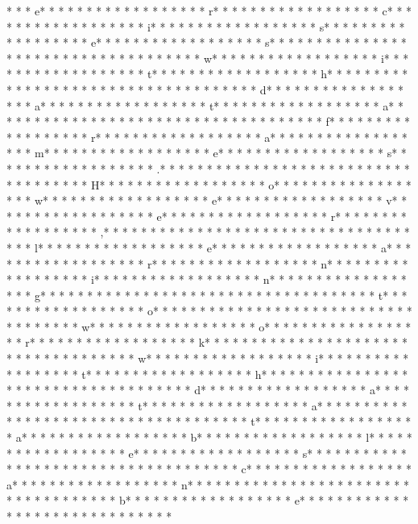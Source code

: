 * *  * e* * *  * * *  * * *  *  * * *  *  * * *  * r* * *  * * *  * * *  *  * * *  *  * * *  * c* * *  * * *  * * *  *  * * *  *  * * *  * i* * *  * * *  * * *  *  * * *  *  * * *  * s* * *  * * *  * * *  *  * * *  *  * * *  * e* * *  * * *  * * *  *  * * *  *  * * *  * s* * *  * * *  * * *  *  * * *  *  * * *  *  * * *  * * *  * * *  *  * * *  *  * * *  * w* * *  * * *  * * *  *  * * *  *  * * *  * i* * *  * * *  * * *  *  * * *  *  * * *  * t* * *  * * *  * * *  *  * * *  *  * * *  * h* * *  * * *  * * *  *  * * *  *  * * *  *  * * *  * * *  * * *  *  * * *  *  * * *  * d* * *  * * *  * * *  *  * * *  *  * * *  * a* * *  * * *  * * *  *  * * *  *  * * *  * t* * *  * * *  * * *  *  * * *  *  * * *  * a* * *  * * *  * * *  *  * * *  *  * * *  *  * * *  * * *  * * *  *  * * *  *  * * *  * f* * *  * * *  * * *  *  * * *  *  * * *  * r* * *  * * *  * * *  *  * * *  *  * * *  * a* * *  * * *  * * *  *  * * *  *  * * *  * m* * *  * * *  * * *  *  * * *  *  * * *  * e* * *  * * *  * * *  *  * * *  *  * * *  * s* * *  * * *  * * *  *  * * *  *  * * *  * .* * *  * * *  * * *  *  * * *  *  * * *  *  * * *  * * *  * * *  *  * * *  *  * * *  * H* * *  * * *  * * *  *  * * *  *  * * *  * o* * *  * * *  * * *  *  * * *  *  * * *  * w* * *  * * *  * * *  *  * * *  *  * * *  * e* * *  * * *  * * *  *  * * *  *  * * *  * v* * *  * * *  * * *  *  * * *  *  * * *  * e* * *  * * *  * * *  *  * * *  *  * * *  * r* * *  * * *  * * *  *  * * *  *  * * *  * ,* * *  * * *  * * *  *  * * *  *  * * *  *  * * *  * * *  * * *  *  * * *  *  * * *  * l* * *  * * *  * * *  *  * * *  *  * * *  * e* * *  * * *  * * *  *  * * *  *  * * *  * a* * *  * * *  * * *  *  * * *  *  * * *  * r* * *  * * *  * * *  *  * * *  *  * * *  * n* * *  * * *  * * *  *  * * *  *  * * *  * i* * *  * * *  * * *  *  * * *  *  * * *  * n* * *  * * *  * * *  *  * * *  *  * * *  * g* * *  * * *  * * *  *  * * *  *  * * *  *  * * *  * * *  * * *  *  * * *  *  * * *  * t* * *  * * *  * * *  *  * * *  *  * * *  * o* * *  * * *  * * *  *  * * *  *  * * *  *  * * *  * * *  * * *  *  * * *  *  * * *  * w* * *  * * *  * * *  *  * * *  *  * * *  * o* * *  * * *  * * *  *  * * *  *  * * *  * r* * *  * * *  * * *  *  * * *  *  * * *  * k* * *  * * *  * * *  *  * * *  *  * * *  *  * * *  * * *  * * *  *  * * *  *  * * *  * w* * *  * * *  * * *  *  * * *  *  * * *  * i* * *  * * *  * * *  *  * * *  *  * * *  * t* * *  * * *  * * *  *  * * *  *  * * *  * h* * *  * * *  * * *  *  * * *  *  * * *  *  * * *  * * *  * * *  *  * * *  *  * * *  * d* * *  * * *  * * *  *  * * *  *  * * *  * a* * *  * * *  * * *  *  * * *  *  * * *  * t* * *  * * *  * * *  *  * * *  *  * * *  * a* * *  * * *  * * *  *  * * *  *  * * *  *  * * *  * * *  * * *  *  * * *  *  * * *  * t* * *  * * *  * * *  *  * * *  *  * * *  * a* * *  * * *  * * *  *  * * *  *  * * *  * b* * *  * * *  * * *  *  * * *  *  * * *  * l* * *  * * *  * * *  *  * * *  *  * * *  * e* * *  * * *  * * *  *  * * *  *  * * *  * s* * *  * * *  * * *  *  * * *  *  * * *  *  * * *  * * *  * * *  *  * * *  *  * * *  * c* * *  * * *  * * *  *  * * *  *  * * *  * a* * *  * * *  * * *  *  * * *  *  * * *  * n* * *  * * *  * * *  *  * * *  *  * * *  *  * * *  * * *  * * *  *  * * *  *  * * *  * b* * *  * * *  * * *  *  * * *  *  * * *  * e* * *  * * *  * * *  *  * * *  *  * * *  *  * * *  * * *  * * *  *  * * 